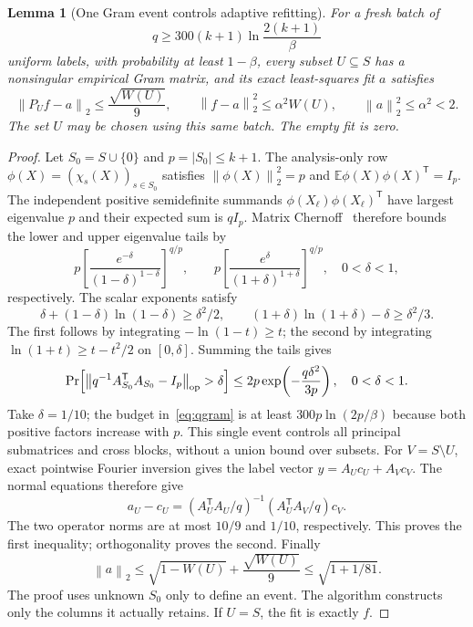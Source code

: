 \documentclass[11pt]{article}
\newtheorem{lemma}[theorem]{Lemma}
\theoremstyle{remark}\newtheorem{remark}[theorem]{Remark}
\newcommand{\E}{\mathbb E}
\newcommand{\norm}[1]{\left\|#1\right\|}
\begin{document}
\begin{lemma}[One Gram event controls adaptive refitting]\label{lem:fit}
For a fresh batch of
\begin{equation}\label{eq:qgram}
 q\ge300(k+1)\ln\frac{2(k+1)}\beta
\end{equation}
uniform labels, with probability at least $1-\beta$, every subset $U\subseteq S$ has a nonsingular empirical Gram matrix, and its exact least-squares fit $a$ satisfies
\begin{equation}\label{eq:invariant}
 \norm{P_Uf-a}_2\le\frac{\sqrt{W(U)}}9,\qquad
 \norm{f-a}_2^2\le\alpha^2 W(U),\qquad \norm a_2^2\le\alpha^2<2.
\end{equation}
The set $U$ may be chosen using this same batch. The empty fit is zero.
\end{lemma}
\begin{proof}
Let $S_0=S\cup\{0\}$ and $p=|S_0|\le k+1$. The analysis-only row $\phi(X)=(\chi_s(X))_{s\in S_0}$ satisfies $\norm{\phi(X)}_2^2=p$ and $\E\phi(X)\phi(X)^\mathsf T=I_p$. The independent positive semidefinite summands $\phi(X_\ell)\phi(X_\ell)^\mathsf T$ have largest eigenvalue $p$ and their expected sum is $qI_p$. Matrix Chernoff~\cite[Corollary~5.2]{Tropp} therefore bounds the lower and upper eigenvalue tails by
\[
 p\left[\frac{e^{-\delta}}{(1-\delta)^{1-\delta}}\right]^{q/p},
 \qquad
 p\left[\frac{e^{\delta}}{(1+\delta)^{1+\delta}}\right]^{q/p},
 \quad 0<\delta<1,
\]
respectively. The scalar exponents satisfy
\[
 \delta+(1-\delta)\ln(1-\delta)\ge\delta^2/2,\qquad
 (1+\delta)\ln(1+\delta)-\delta\ge\delta^2/3.
\]
The first follows by integrating $-\ln(1-t)\ge t$; the second by integrating $\ln(1+t)\ge t-t^2/2$ on $[0,\delta]$. Summing the tails gives
\[
 \Pr\!\left[\norm{q^{-1}A_{S_0}^{\mathsf T}A_{S_0}-I_p}_{\rm op}>\delta\right]
 \le2p\exp\!\left(-\frac{q\delta^2}{3p}\right),\quad0<\delta<1.
\]
Take $\delta=1/10$; the budget in~\eqref{eq:qgram} is at least $300p\ln(2p/\beta)$ because both positive factors increase with $p$. This single event controls all principal submatrices and cross blocks, without a union bound over subsets. For $V=S\setminus U$, exact pointwise Fourier inversion gives the label vector $y=A_Uc_U+A_Vc_V$. The normal equations therefore give
\[
 a_U-c_U=(A_U^{\mathsf T}A_U/q)^{-1}(A_U^{\mathsf T}A_V/q)c_V.
\]
The two operator norms are at most $10/9$ and $1/10$, respectively. This proves the first inequality; orthogonality proves the second. Finally
\[
 \norm a_2\le\sqrt{1-W(U)}+\frac{\sqrt{W(U)}}9\le\sqrt{1+1/81}.
\]
The proof uses unknown $S_0$ only to define an event. The algorithm constructs only the columns it actually retains. If $U=S$, the fit is exactly $f$.
\end{proof}
\end{document}
